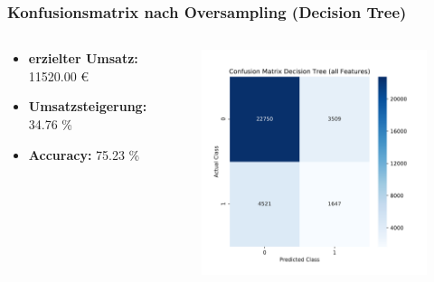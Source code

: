 \documentclass{beamer}
\begin{document}
\begin{frame}
\frametitle{Konfusionsmatrix nach Oversampling (Decision Tree)}
\begin{columns}[c] %

\begin{tiny}
\begin{itemize}
\item  \textbf{erzielter Umsatz:} 11520.00 \euro{}
\item \textbf{Umsatzsteigerung:}	34.76 \% 
\item \textbf{Accuracy:} 75.23 \%
\end{itemize}
\end{tiny}

\begin{figure}
\begin{center}
\includegraphics[width=.8\textwidth]{pdf/confusion2.pdf}
\end{center}
\end{figure}



\end{columns}
\end{frame}
\end{document}
